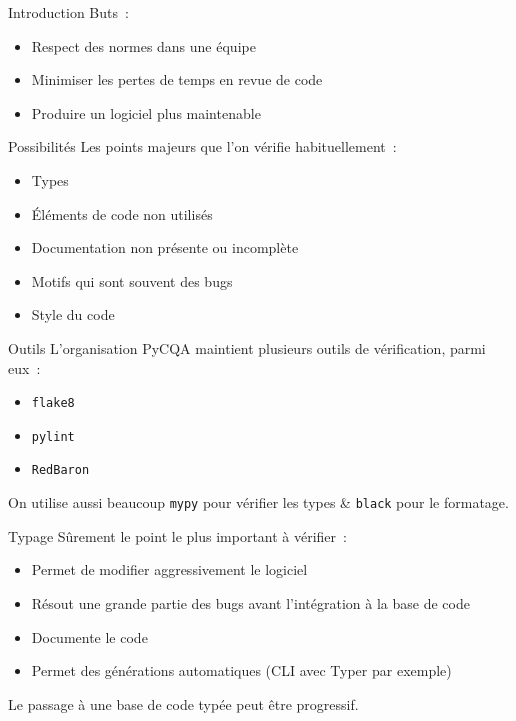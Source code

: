 \begin{frame}{Introduction}
  Buts~:
  \begin{itemize}
    \item Respect des normes dans une équipe
    \item Minimiser les pertes de temps en revue de code
    \item Produire un logiciel plus maintenable
  \end{itemize}
\end{frame}

\begin{frame}{Possibilités}
  Les points majeurs que l'on vérifie habituellement~:

  \begin{itemize}
    \item Types
    \item Éléments de code non utilisés
    \item Documentation non présente ou incomplète
    \item Motifs qui sont souvent des bugs
    \item Style du code
  \end{itemize}
\end{frame}

\begin{frame}{Outils}
  L'organisation PyCQA maintient plusieurs outils de vérification, parmi eux~:

  \begin{itemize}
    \item \texttt{flake8}
    \item \texttt{pylint}
    \item \texttt{RedBaron}
  \end{itemize}

  On utilise aussi beaucoup \texttt{mypy} pour vérifier les types \& \texttt{black} pour le formatage.
\end{frame}

\begin{frame}{Typage}
  Sûrement le point le plus important à vérifier~:

  \begin{itemize}
    \item Permet de modifier aggressivement le logiciel
    \item Résout une grande partie des bugs avant l'intégration à la base de code
    \item Documente le code
    \item Permet des générations automatiques (CLI avec Typer par exemple)
  \end{itemize}

  Le passage à une base de code typée peut être progressif.
\end{frame}

